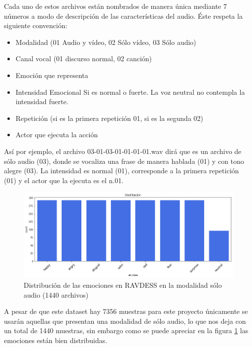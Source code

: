 \documentclass[11pt,a4paper,spanish]{book}
\begin{document}
	Cada uno de estos archivos están nombrados de manera única mediante 7 números a modo de descripción de las características del audio. Éste respeta la siguiente convención:
	\begin{itemize}
		\item Modalidad (01 Audio y vídeo, 02 Sólo vídeo, 03 Sólo audio)
		\item Canal vocal (01 discurso normal, 02 canción)
		\item Emoción que representa
		\item Intensidad Emocional Si es normal o fuerte. La voz neutral no contempla la intensidad fuerte.
		\item Repetición (si es la primera repetición 01, si es la segunda 02)
		\item Actor que ejecuta la acción
	\end{itemize}

	Así por ejemplo, el archivo 03-01-03-01-01-01-01.wav dirá que es un archivo de sólo audio (03), donde se vocaliza una frase de manera hablada (01) y con tono alegre (03). La intensidad es normal (01), corresponde a la primera repetición (01) y el actor que la ejecuta es el n.01.
	
	\begin{figure}[H]
		\centering
		\includegraphics[scale=0.35]{ravdess_distribucion.png} 
		\caption{Distribución de las emociones en RAVDESS en la modalidad sólo audio (1440 archivos)}
		\label{fig:emociones_ravdess}
	\end{figure}
	
	A pesar de que este dataset hay 7356 muestras para este proyecto únicamente se usarán aquellas que presentan una modalidad de sólo audio, lo que nos deja con un total de 1440 muestras, sin embargo como se puede apreciar en la figura \ref{fig:emociones_ravdess} las emociones están bien distribuidas.
	
\end{document}

